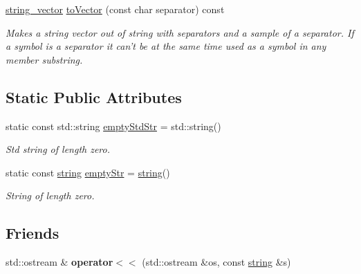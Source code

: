 \begin{DoxyCompactItemize}
\item 
\hyperlink{classmbdev_1_1string__vector}{string\-\_\-vector} \hyperlink{classmbdev_1_1string_a32e61d95ec60bc8c9a419551284278aa}{to\-Vector} (const char separator) const 
\begin{DoxyCompactList}\small\item\em \-Makes a string vector out of string with separators and a sample of a separator. \-If a symbol is a separator it can't be at the same time used as a symbol in any member substring. \end{DoxyCompactList}\end{DoxyCompactItemize}
\subsection*{\-Static \-Public \-Attributes}
\begin{DoxyCompactItemize}
\item 
\hypertarget{classmbdev_1_1string_abe8e7c5dd8a04459bb1f323c9fd54f2a}{static const std\-::string \hyperlink{classmbdev_1_1string_abe8e7c5dd8a04459bb1f323c9fd54f2a}{empty\-Std\-Str} = std\-::string()}\label{classmbdev_1_1string_abe8e7c5dd8a04459bb1f323c9fd54f2a}

\begin{DoxyCompactList}\small\item\em \-Std string of length zero. \end{DoxyCompactList}\item 
\hypertarget{classmbdev_1_1string_af3502d5e7550b0328ce963f6e32d6856}{static const \hyperlink{classmbdev_1_1string}{string} \hyperlink{classmbdev_1_1string_af3502d5e7550b0328ce963f6e32d6856}{empty\-Str} = \hyperlink{classmbdev_1_1string}{string}()}\label{classmbdev_1_1string_af3502d5e7550b0328ce963f6e32d6856}

\begin{DoxyCompactList}\small\item\em \-String of length zero. \end{DoxyCompactList}\end{DoxyCompactItemize}
\subsection*{\-Friends}
\begin{DoxyCompactItemize}
\item 
\hypertarget{classmbdev_1_1string_ab3a419ebbe25751e69a82233c9d11310}{std\-::ostream \& {\bfseries operator$<$$<$} (std\-::ostream \&os, const \hyperlink{classmbdev_1_1string}{string} \&s)}\label{classmbdev_1_1string_ab3a419ebbe25751e69a82233c9d11310}

\end{DoxyCompactItemize}


